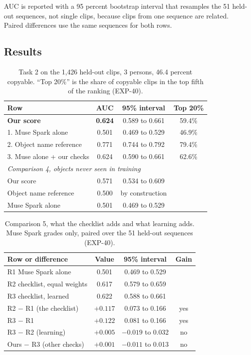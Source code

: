 \documentclass[10pt,twocolumn,letterpaper]{article}
\begin{document}
AUC is reported with a 95 percent bootstrap interval that resamples the 51
held-out sequences, not single clips, because clips from one sequence are
related. Paired differences use the same sequences for both rows.

\subsection{Results}

\begin{table}[t]
\centering
\caption{Task 2 on the 1,426 held-out clips, 3 persons, 46.4 percent copyable.
``Top 20\%'' is the share of copyable clips in the top fifth of the ranking
(EXP-40).}
\label{tab:num2}
\small
\begin{tabular}{lccc}
\toprule
Row & AUC & 95\% interval & Top 20\% \\
\midrule
\textbf{Our score} & \textbf{0.624} & 0.589 to 0.661 & 59.4\% \\
1. Muse Spark alone & 0.501 & 0.469 to 0.529 & 46.9\% \\
2. Object name reference & 0.771 & 0.744 to 0.792 & 79.4\% \\
3. Muse alone + our checks & 0.624 & 0.590 to 0.661 & 62.6\% \\
\midrule
\multicolumn{4}{l}{\emph{Comparison 4, objects never seen in training}} \\
Our score & 0.571 & 0.534 to 0.609 & \\
Object name reference & 0.500 & by construction & \\
Muse Spark alone & 0.501 & 0.469 to 0.529 & \\
\bottomrule
\end{tabular}
\end{table}

\begin{table}[t]
\centering
\caption{Comparison 5, what the checklist adds and what learning adds. Muse
Spark grades only, paired over the 51 held-out sequences (EXP-40).}
\label{tab:num2c5}
\small
\begin{tabular}{lccc}
\toprule
Row or difference & Value & 95\% interval & Gain \\
\midrule
R1 Muse Spark alone & 0.501 & 0.469 to 0.529 & \\
R2 checklist, equal weights & 0.617 & 0.579 to 0.659 & \\
R3 checklist, learned & 0.622 & 0.588 to 0.661 & \\
\midrule
R2 $-$ R1 (the checklist) & $+0.117$ & 0.073 to 0.166 & yes \\
R3 $-$ R1 & $+0.122$ & 0.081 to 0.166 & yes \\
R3 $-$ R2 (learning) & $+0.005$ & $-0.019$ to 0.032 & no \\
Ours $-$ R3 (other checks) & $+0.001$ & $-0.011$ to 0.013 & no \\
\bottomrule
\end{tabular}
\end{table}
\end{document}
